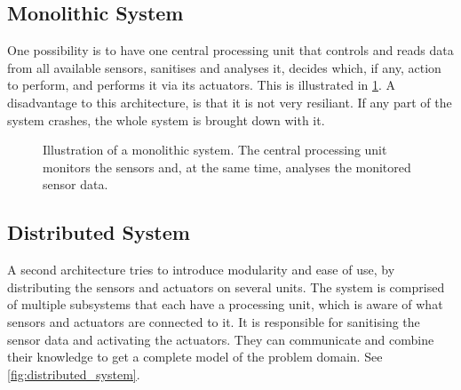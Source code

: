 \subsection{Monolithic System}
One possibility is to have one central processing unit that controls and reads data from all available sensors, sanitises and analyses it, decides which, if any, action to perform, and performs it via its actuators. This is illustrated in \cref{fig:monolithic_system}. A disadvantage to this architecture, is that it is not very resiliant. If any part of the system crashes, the whole system is brought down with it.

\begin{figure}[htbp]
\centering
{}
\caption[Monolithic system]{Illustration of a monolithic system. The central processing unit monitors the sensors and, at the same time, analyses the monitored sensor data.}\label{fig:monolithic_system}
\end{figure}


\subsection{Distributed System}
A second architecture tries to introduce modularity and ease of use, by distributing the sensors and actuators on several units. The system is comprised of multiple subsystems that each have a processing unit, which is aware of what sensors and actuators are connected to it. It is responsible for sanitising the sensor data and activating the actuators. They can communicate and combine their knowledge to get a complete model of the problem domain. See \cref{fig:distributed_system}.

